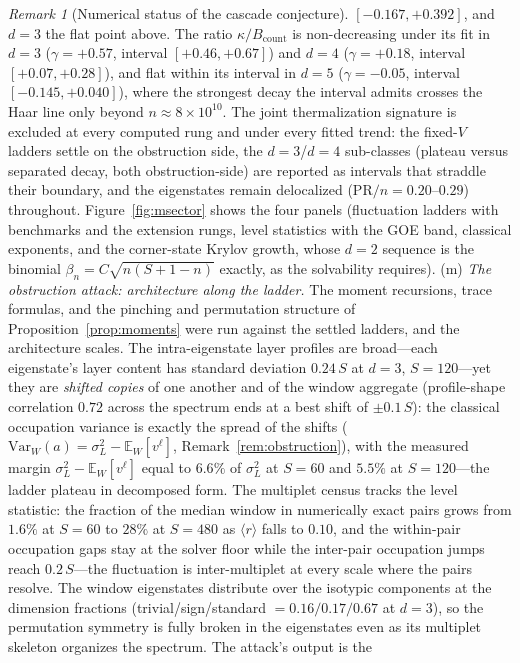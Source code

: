 \documentclass[11pt,a4paper]{article}
\theoremstyle{plain}
\theoremstyle{definition}
\theoremstyle{remark}
\newtheorem{remark}[theorem]{Remark}
\begin{document}
\begin{remark}[Numerical status of the cascade conjecture]
$[-0.167,+0.392]$, and $d=3$ the flat point above. The ratio
$\kappa/B_{\mathrm{count}}$ is non-decreasing under its fit in $d=3$
($\gamma=+0.57$, interval $[+0.46,+0.67]$) and $d=4$ ($\gamma=+0.18$,
interval $[+0.07,+0.28]$), and flat within its interval in $d=5$
($\gamma=-0.05$, interval $[-0.145,+0.040]$), where the strongest decay
the interval admits crosses the Haar line only beyond
$n\approx8\times10^{10}$. The joint thermalization signature is
excluded at every computed rung and under every fitted trend: the
fixed-$V$ ladders settle on the obstruction side, the $d=3$/$d=4$
sub-classes (plateau versus separated decay, both obstruction-side) are
reported as intervals that straddle their boundary, and the eigenstates
remain delocalized ($\mathrm{PR}/n=0.20$--$0.29$) throughout.
Figure~\ref{fig:msector}
shows the four panels (fluctuation ladders with benchmarks and the
extension rungs, level statistics with the GOE band, classical
exponents, and the corner-state Krylov growth, whose $d=2$ sequence is
the binomial $\beta_n=C\sqrt{n(S+1-n)}$ exactly, as the solvability
requires).
(m) \emph{The obstruction attack: architecture along the ladder.} The
moment recursions, trace formulas, and the pinching and permutation
structure of Proposition~\ref{prop:moments} were run against the settled
ladders, and the architecture scales. The intra-eigenstate layer profiles
are broad---each eigenstate's layer content has standard deviation
$0.24\,S$ at $d=3$, $S=120$---yet they are \emph{shifted copies} of one
another and of the window aggregate (profile-shape correlation $0.72$
across the spectrum ends at a best shift of $\pm0.1\,S$): the classical
occupation variance is exactly the spread of the shifts
($\mathrm{Var}_{W}(a)=\sigma_L^{2}-\mathbb{E}_W[v^{\ell}]$,
Remark~\ref{rem:obstruction}), with the measured margin
$\sigma_L^{2}-\mathbb{E}_W[v^{\ell}]$ equal to $6.6\%$ of
$\sigma_L^{2}$ at $S=60$ and $5.5\%$ at $S=120$---the ladder plateau in
decomposed form. The multiplet census tracks the level statistic: the
fraction of the median window in numerically exact pairs grows from
$1.6\%$ at $S=60$ to $28\%$ at $S=480$ as $\langle r\rangle$ falls to
$0.10$, and the within-pair occupation gaps stay at the solver floor
while the inter-pair occupation jumps reach $0.2\,S$---the fluctuation is
inter-multiplet at every scale where the pairs resolve. The window
eigenstates distribute over the isotypic components at the dimension
fractions (trivial/sign/standard $=0.16/0.17/0.67$ at $d=3$), so the
permutation symmetry is fully broken in the eigenstates even as its
multiplet skeleton organizes the spectrum. The attack's output is the

\end{remark}
\end{document}
